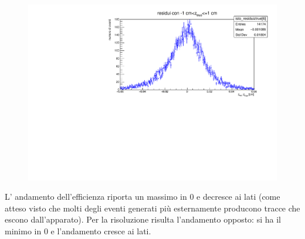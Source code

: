 \documentclass{article}
\begin{document}
\begin{figure}[H]
	\centering
	\includegraphics[scale=0.5]{resztrue}
\end{figure}
\noindent
L' andamento dell'efficienza riporta un massimo in $0$ e decresce ai lati (come atteso visto che molti degli eventi generati più esternamente producono tracce che escono dall'apparato). Per la risoluzione risulta l'andamento opposto: si ha il minimo in $0$ e l'andamento cresce ai lati.
\end{document}
